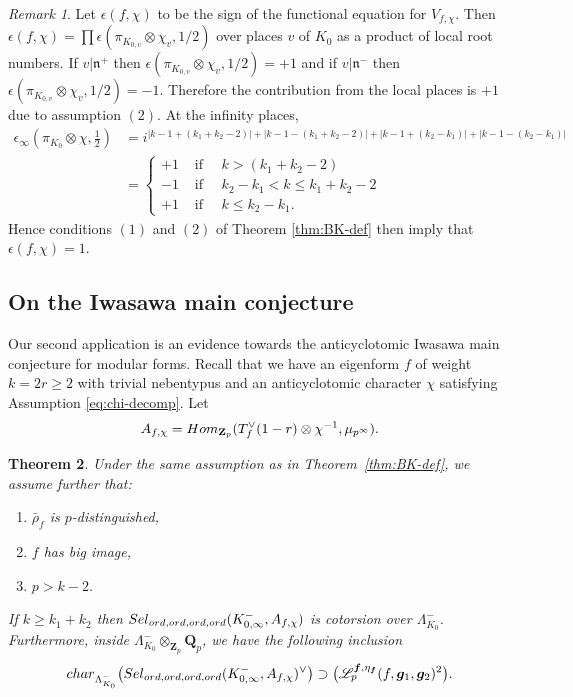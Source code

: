 \documentclass[10pt,letterpaper]{amsart}
\theoremstyle{plain}
\newtheorem{thm}{Theorem}[subsection] %
\theoremstyle{definition}
\theoremstyle{definition}
\theoremstyle{plain}
\theoremstyle{plain}
\theoremstyle{plain}
\theoremstyle{remark}
\newtheorem{rem}[thm]{Remark}
\numberwithin{equation}{section}
\newcommand{\fkn}{\mathfrak{n}}
\newcommand{\ord}{{{\rm ord},{\rm ord}}}
\newcommand{\unb}{{\boldsymbol{f}}}
\newcommand{\Q}{\mathbf{Q}}
\newcommand{\Z}{\mathbf{Z}}
\newcommand{\bff}{{\boldsymbol{f}}}
\newcommand{\bfg}{{\boldsymbol{g}}}
\begin{document}
\begin{rem}\label{rootnumber}Let $\epsilon(f,\chi)$ to be the sign of the functional equation for $V_{f,\chi}$. Then $\epsilon(f,\chi)=\prod \epsilon(\pi_{K_{0,v}}\otimes \chi_v,1/2)$ over places $v$ of $K_0$ as a product of local root numbers. If $v|\fkn^+$ then $\epsilon(\pi_{K_{0,v}}\otimes \chi_v,1/2)=+1$ and if $v|\fkn^-$ then $\epsilon(\pi_{K_{0,v}}\otimes \chi_v,1/2)=-1$. Therefore the contribution from the local places is $+1$ due to assumption $(2)$. At the infinity places,
\begin{align*}
    \epsilon_{\infty}(\pi_{K_0}\otimes\chi,\frac{1}{2})&= i^{|k-1+(k_1+k_2-2)|+|k-1-(k_1+k_2-2)|+|k-1+(k_2-k_1)|+|k-1-(k_2-k_1)|} \\&=\begin{cases}
        +1   &\text{ if }\quad k>(k_1+k_2-2)\\
        -1 &\text{ if }\quad k_2-k_1<k\le k_1+k_2-2\\
        +1 &\text{ if } \quad k\le k_2-k_1.
    \end{cases}
\end{align*}
Hence conditions $(1)$ and $(2)$ of Theorem \ref{thm:BK-def} then imply that $\epsilon(f,\chi)=1$.
\end{rem}

\subsection{On the Iwasawa main conjecture}
\label{subsec:IMC-def}

Our second application is an evidence towards the anticyclotomic Iwasawa main conjecture for modular forms. Recall that we have an eigenform $f$ of weight $k=2r\geq 2$ with trivial nebentypus and an anticyclotomic character $\chi$ satisfying Assumption \ref{eq:chi-decomp}. Let
\[
A_{f,\chi}={\rm Hom}_{\Z_p}(T_f^\vee(1-r)\otimes\chi^{-1},\mu_{p^\infty}).
\]

\begin{thm}\label{thm:IMC-def}
Under the same assumption as in Theorem~\ref{thm:BK-def}, we assume further that:
\begin{enumerate}
    \item $\bar{\rho}_f$ is $p$-distinguished,
    \item  $f$ has big image,
    \item $p>k-2.$
\end{enumerate}
If $k\ge k_1+k_2$ then ${\rm Sel}_{\ord,\ord}(K_{0,\infty}^-,A_{f,\chi})$ is cotorsion over $\Lambda_{K_0}^-$. Furthermore, inside $\Lambda_{K_0}^-\otimes_{\Z_p}\Q_p$, we have the following inclusion
\[
{\rm char}_{\Lambda_{K_0}^-}\bigl({\rm Sel}_{\ord,\ord}(K_{0,\infty}^-,A_{f,\chi})^\vee\bigr)\supset\bigl(\mathscr{L}_p^{\unb,\eta_\bff}(f,\bfg_1,\bfg_2)^2\bigr).
\]

\end{thm}
\end{document}
